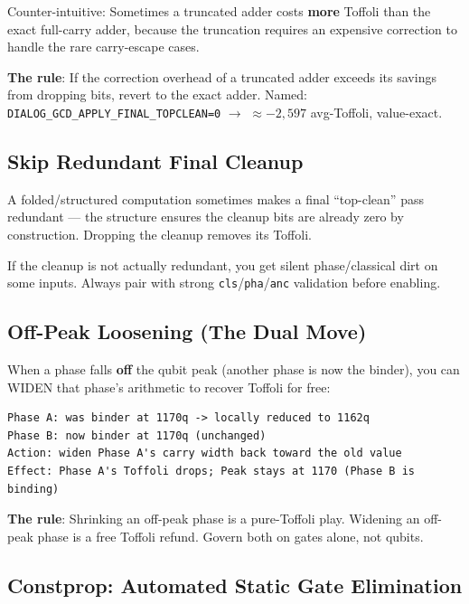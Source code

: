 \documentclass[11pt,a4paper]{article}
\newcommand{\cls}{\texttt{cls}\xspace}
\newcommand{\pha}{\texttt{pha}\xspace}
\newcommand{\anc}{\texttt{anc}\xspace}
\begin{document}
Counter-intuitive: Sometimes a truncated adder costs \textbf{more} Toffoli than the exact
full-carry adder, because the truncation requires an expensive correction to handle the rare
carry-escape cases.

\textbf{The rule}: If the correction overhead of a truncated adder exceeds its savings from
dropping bits, revert to the exact adder. Named: \texttt{DIALOG\_GCD\_APPLY\_FINAL\_TOPCLEAN=0}
$\to$ $\approx{-2{,}597}$ avg-Toffoli, value-exact.

\subsection{Skip Redundant Final Cleanup}
\label{sec:skipclean}

A folded/structured computation sometimes makes a final ``top-clean'' pass redundant --- the
structure ensures the cleanup bits are already zero by construction. Dropping the cleanup removes
its Toffoli.

\begin{tcolorbox}[noteboxstyle, title=Highest-risk move]
If the cleanup is not actually redundant, you get silent phase/classical dirt on some inputs.
Always pair with strong \cls/\pha/\anc{} validation before enabling.
\end{tcolorbox}

\subsection{Off-Peak Loosening (The Dual Move)}

When a phase falls \textbf{off} the qubit peak (another phase is now the binder), you can WIDEN
that phase's arithmetic to recover Toffoli for free:
\begin{lstlisting}
Phase A: was binder at 1170q -> locally reduced to 1162q
Phase B: now binder at 1170q (unchanged)
Action: widen Phase A's carry width back toward the old value
Effect: Phase A's Toffoli drops; Peak stays at 1170 (Phase B is binding)
\end{lstlisting}

\textbf{The rule}: Shrinking an off-peak phase is a pure-Toffoli play. Widening an off-peak phase
is a free Toffoli refund. Govern both on gates alone, not qubits.

\subsection{Constprop: Automated Static Gate Elimination}
\end{document}
